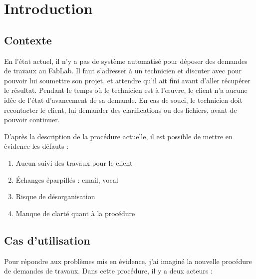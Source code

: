 \documentclass[
    iai, %
    eai, %
]{heig-tb}
\begin{document}
\maketitle
\frontmatter
\clearemptydoublepage

\preamble
\authentification

\begin{abstract}
  
\end{abstract}

\clearemptydoublepage
{
  \tableofcontents
  \let\cleardoublepage\clearpage
  \listoffigures
  \let\cleardoublepage\clearpage
  \listoftables
  \let\cleardoublepage\clearpage
  \listoflistings
}

\printnomenclature
\clearemptydoublepage
{}


\mainmatter
\chapter{Introduction}
\section{Contexte}
En l'état actuel, il n'y a pas de système automatisé pour déposer des demandes de travaux au FabLab. Il faut s'adresser à un technicien et discuter avec pour pouvoir lui soumettre son projet, et attendre qu'il ait fini avant d'aller récupérer le résultat. Pendant le temps où le technicien est à l'œuvre, le client n'a aucune idée de l'état d'avancement de sa demande. En cas de souci, le technicien doit recontacter le client, lui demander des clarifications ou des fichiers, avant de pouvoir continuer.

D'après la description de la procédure actuelle, il est possible de mettre en évidence les défauts :

\begin{enumerate}
  \item Aucun suivi des travaux pour le client
  \item Échanges éparpillés : email, vocal
  \item Risque de désorganisation
  \item Manque de clarté quant à la procédure
\end{enumerate}

\section{Cas d'utilisation}
Pour répondre aux problèmes mis en évidence, j'ai imaginé la nouvelle procédure de demandes de travaux. Dans cette procédure, il y a deux acteurs :
\end{document}
